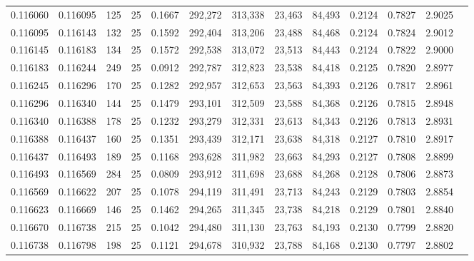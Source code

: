 \begin{tabular}{rrrrrrrrrrrrr}
0.116060 & 0.116095 &   125 &  25 &                                     0.1667 & 292,272 & 313,338 &  23,463 &  84,493 & 0.2124 & 0.7827 & 2.9025 \\
0.116095 & 0.116143 &   132 &  25 &                                     0.1592 & 292,404 & 313,206 &  23,488 &  84,468 & 0.2124 & 0.7824 & 2.9012 \\
0.116145 & 0.116183 &   134 &  25 &                                     0.1572 & 292,538 & 313,072 &  23,513 &  84,443 & 0.2124 & 0.7822 & 2.9000 \\
0.116183 & 0.116244 &   249 &  25 &                                     0.0912 & 292,787 & 312,823 &  23,538 &  84,418 & 0.2125 & 0.7820 & 2.8977 \\
0.116245 & 0.116296 &   170 &  25 &                                     0.1282 & 292,957 & 312,653 &  23,563 &  84,393 & 0.2126 & 0.7817 & 2.8961 \\
0.116296 & 0.116340 &   144 &  25 &                                     0.1479 & 293,101 & 312,509 &  23,588 &  84,368 & 0.2126 & 0.7815 & 2.8948 \\
0.116340 & 0.116388 &   178 &  25 &                                     0.1232 & 293,279 & 312,331 &  23,613 &  84,343 & 0.2126 & 0.7813 & 2.8931 \\
0.116388 & 0.116437 &   160 &  25 &                                     0.1351 & 293,439 & 312,171 &  23,638 &  84,318 & 0.2127 & 0.7810 & 2.8917 \\
0.116437 & 0.116493 &   189 &  25 &                                     0.1168 & 293,628 & 311,982 &  23,663 &  84,293 & 0.2127 & 0.7808 & 2.8899 \\
0.116493 & 0.116569 &   284 &  25 &                                     0.0809 & 293,912 & 311,698 &  23,688 &  84,268 & 0.2128 & 0.7806 & 2.8873 \\
0.116569 & 0.116622 &   207 &  25 &                                     0.1078 & 294,119 & 311,491 &  23,713 &  84,243 & 0.2129 & 0.7803 & 2.8854 \\
0.116623 & 0.116669 &   146 &  25 &                                     0.1462 & 294,265 & 311,345 &  23,738 &  84,218 & 0.2129 & 0.7801 & 2.8840 \\
0.116670 & 0.116738 &   215 &  25 &                                     0.1042 & 294,480 & 311,130 &  23,763 &  84,193 & 0.2130 & 0.7799 & 2.8820 \\
0.116738 & 0.116798 &   198 &  25 &                                     0.1121 & 294,678 & 310,932 &  23,788 &  84,168 & 0.2130 & 0.7797 & 2.8802 \\

\end{tabular}
